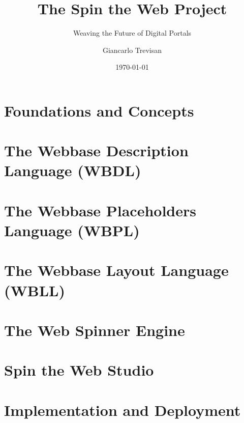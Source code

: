 \documentclass[11pt,openright,twoside,a4paper]{book}
\title{The Spin the Web Project}
\subtitle{Weaving the Future of Digital Portals}
\author{Giancarlo Trevisan}
\date{\today}
\begin{document}
\frontmatter




\tableofcontents

\mainmatter

\part{Foundations and Concepts}







\part{The Webbase Description Language (WBDL)}





\part{The Webbase Placeholders Language (WBPL)}


\part{The Webbase Layout Language (WBLL)}


\part{The Web Spinner Engine}


\part{Spin the Web Studio}


\part{Implementation and Deployment}

\end{document}
